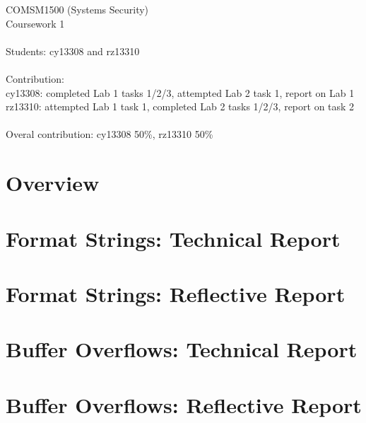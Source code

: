 \documentclass[11pt, onecolumn]{article}
\newcommand\tab[1][1cm]{\hspace*{#1}}
\begin{document}
COMSM1500 (Systems Security)\\
Coursework 1\\
\\
Students: cy13308 and rz13310 \\
\\
Contribution: \\
\tab[1cm] cy13308: completed Lab 1 tasks 1/2/3, attempted Lab 2 task 1, report on Lab 1\\
\tab[1cm] rz13310: attempted Lab 1 task 1, completed Lab 2 tasks 1/2/3, report on task 2
\\
\\
Overal contribution: cy13308 50\%, rz13310 50\%
\newpage


\section{Overview}


\section{Format Strings: Technical Report}


\section{Format Strings: Reflective Report}


\newpage
\section{Buffer Overflows: Technical Report}

\section{Buffer Overflows: Reflective Report}



\newpage
{}

\end{document}
